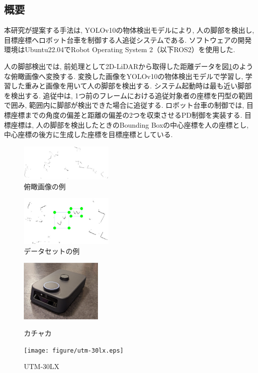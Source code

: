 \documentclass[twocolumn]{jarticle} %
\begin{document}
\subsection{概要}
本研究が提案する手法は, YOLOv10の物体検出モデルにより, 人の脚部を検出し, 目標座標へロボット台車を制御する人追従システムである. ソフトウェアの開発環境はUbuntu22.04でRobot Operating System 2（以下ROS2）を使用した. 

人の脚部検出では, 前処理として2D-LiDARから取得した距離データを図\ref{fig:laser_img}のような俯瞰画像へ変換する. 変換した画像をYOLOv10の物体検出モデルで学習し, 学習した重みと画像を用いて人の脚部を検出する. システム起動時は最も近い脚部を検出する. 追従中は, 1つ前のフレームにおける追従対象者の座標を円型の範囲で囲み, 範囲内に脚部が検出できた場合に追従する. ロボット台車の制御では, 目標座標までの角度の偏差と距離の偏差の2つを収束させるPD制御を実装する. 目標座標は, 人の脚部を検出したときのBounding Boxの中心座標を人の座標とし, 中心座標の後方に生成した座標を目標座標としている.

\begin{figure}[ht]
  \centering
  \large
  \includegraphics[width=45mm]{figure/laser_img_232.eps}
  \caption{俯瞰画像の例}
  \label{fig:laser_img}
\end{figure}

\begin{figure}[ht]
  \centering
  \large
  \includegraphics[width=45mm]{figure/ex-data-sets.eps}
  \caption{データセットの例}
  \label{fig:dataset}
\end{figure}

\begin{figure}[ht]
  \begin{minipage}[b]{0.45\linewidth}
    \centering
    \includegraphics[height=30mm]{figure/kachaka.eps}
    \caption{カチャカ}
    \label{fig:kachaka}
  \end{minipage}
  \begin{minipage}[b]{0.45\linewidth}
    \centering
    \texttt{[image: figure/utm-30lx.eps]}
    \caption{UTM-30LX}
    \label{fig:lidar}
  \end{minipage}
\end{figure}
\end{document}
